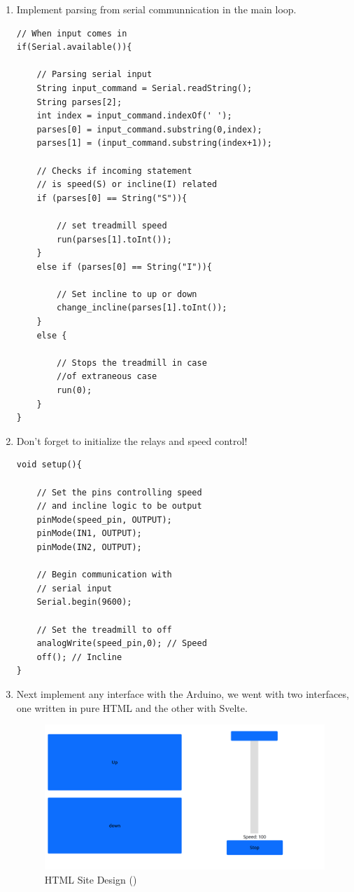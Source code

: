 \documentclass[journal]{IEEEtran}
\newcommand{\MYhref}[3][blue]{\href{#2}{\color{#1}{#3}}}%
\begin{document}
\begin{enumerate}
\pagebreak

\item Implement parsing from serial communnication in the main loop.
\begin{lstlisting}[language=Arduino]
// When input comes in
if(Serial.available()){ 

    // Parsing serial input
    String input_command = Serial.readString();
    String parses[2];
    int index = input_command.indexOf(' ');
    parses[0] = input_command.substring(0,index);
    parses[1] = (input_command.substring(index+1));

    // Checks if incoming statement 
    // is speed(S) or incline(I) related
    if (parses[0] == String("S")){
    
        // set treadmill speed
        run(parses[1].toInt()); 
    }
    else if (parses[0] == String("I")){
    
        // Set incline to up or down
        change_incline(parses[1].toInt());
    }
    else {
    
        // Stops the treadmill in case
        //of extraneous case
        run(0);
    }
}
\end{lstlisting}
\pagebreak
\item Don't forget to initialize the relays and speed control!
\begin{lstlisting}[language=Arduino]
void setup(){

    // Set the pins controlling speed 
    // and incline logic to be output
    pinMode(speed_pin, OUTPUT);
    pinMode(IN1, OUTPUT);
    pinMode(IN2, OUTPUT);

    // Begin communication with 
    // serial input
    Serial.begin(9600); 

    // Set the treadmill to off
    analogWrite(speed_pin,0); // Speed
    off(); // Incline
}
\end{lstlisting}

\item Next implement any interface with the Arduino, we went with two interfaces, one written in pure HTML and the other with Svelte.
    \begin{figure}[H]
            \centering
            \includegraphics[width=1\linewidth]{Treadmill_HTML.png}
            \caption{HTML Site Design (\MYhref{https://leo-berman.github.io/Treadmill-To-Walking-Pad-HTML/}{Try it out!}) }
            \label {fig: 6}
    \end{figure}


\end{enumerate}
\end{document}
